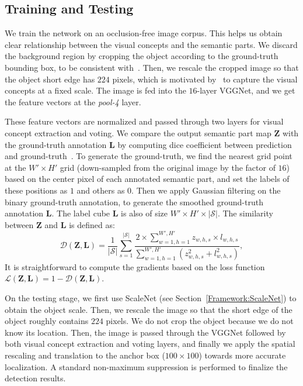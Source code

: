 \documentclass[10pt,twocolumn,letterpaper]{article}
\begin{document}
  \subsection{Training and Testing}
  \label{Framework:Details}

  We train the network on an occlusion-free image corpus. This helps us obtain clear relationship between the visual concepts and the semantic parts. We discard the background region by cropping the object according to the ground-truth bounding box, to be consistent with~\cite{wang2017detecting}. Then, we rescale the cropped image so that the object short edge has $224$ pixels, which is motivated by~\cite{Wang_2017_VC_journal} to capture the visual concepts at a fixed scale. The image is fed into the $16$-layer VGGNet, and we get the feature vectors at the {\em pool-4} layer.

  These feature vectors are normalized and passed through two layers for visual concept extraction and voting. We compare the output semantic part map $\mathbf{Z}$ with the ground-truth annotation $\mathbf{L}$ by computing dice coefficient between prediction and ground-truth~\cite{Milletari_2016_V}. To generate the ground-truth, we find the nearest grid point at the $W'\times H'$ grid (down-sampled from the original image by the factor of $16$) based on the center pixel of each annotated semantic part, and set the labels of these positions as $1$ and others as $0$. Then we apply Gaussian filtering on the binary ground-truth annotation, to generate the smoothed ground-truth annotation $\mathbf{L}$. The label cube $\mathbf{L}$ is also of size $W'\times H'\times\left|\mathcal{S}\right|$. The similarity between $\mathbf{Z}$ and $\mathbf{L}$ is defined as:
  \begin{equation}
  \label{Eqn:ProbPositive}
  {\mathcal{D}\!\left(\mathbf{Z},\mathbf{L}\right)}={\frac{1}{\left|\mathcal{S}\right|}{\sum_{s=1}^{\left|\mathcal{S}\right|}}\frac{2\times{\sum_{w=1,h=1}^{W',H'}}z_{w,h,s}\times l_{w,h,s}}{{\sum_{w=1,h=1}^{W',H'}}\left(z_{w,h,s}^2+l_{w,h,s}^2\right)}},
  \end{equation}
  It is straightforward to compute the gradients based on the loss function ${\mathcal{L}\!\left(\mathbf{Z},\mathbf{L}\right)}={1-\mathcal{D}\!\left(\mathbf{Z},\mathbf{L}\right)}$.

  On the testing stage, we first use ScaleNet (see Section~\ref{Framework:ScaleNet}) to obtain the object scale. Then, we rescale the image so that the short edge of the object roughly contains $224$ pixels. We do not crop the object because we do not know its location. Then, the image is passed through the VGGNet followed by both visual concept extraction and voting layers, and finally we apply the spatial rescaling and translation to the anchor box ($100\times100$) towards more accurate localization. A standard non-maximum suppression is performed to finalize the detection results.
\end{document}
